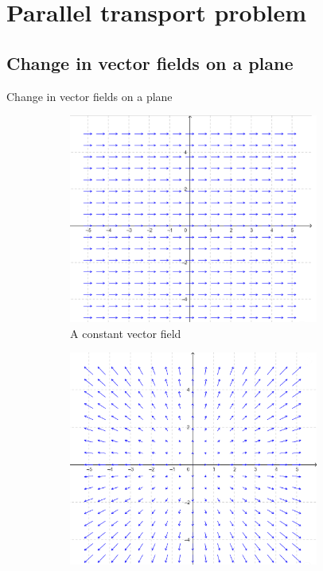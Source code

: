 \documentclass{beamer}
\begin{document}
\section{Parallel transport problem}

\subsection{Change in vector fields on a plane}
\begin{frame}{Change in vector fields on a plane}
\begin{figure}[h!]
    \begin{subfigure}{.5\textwidth}
        \centering  
        \includegraphics[width=0.9\textwidth]{images/vector_field_1.png}
        \caption{A constant vector field}
        \label{fig:sub1}
      \end{subfigure}%
      \begin{subfigure}{.5\textwidth}
        \centering   
        \includegraphics[width=0.9\textwidth]{images/vector_field_2.png}

\end{subfigure}
\end{figure}
\end{frame}
\end{document}
